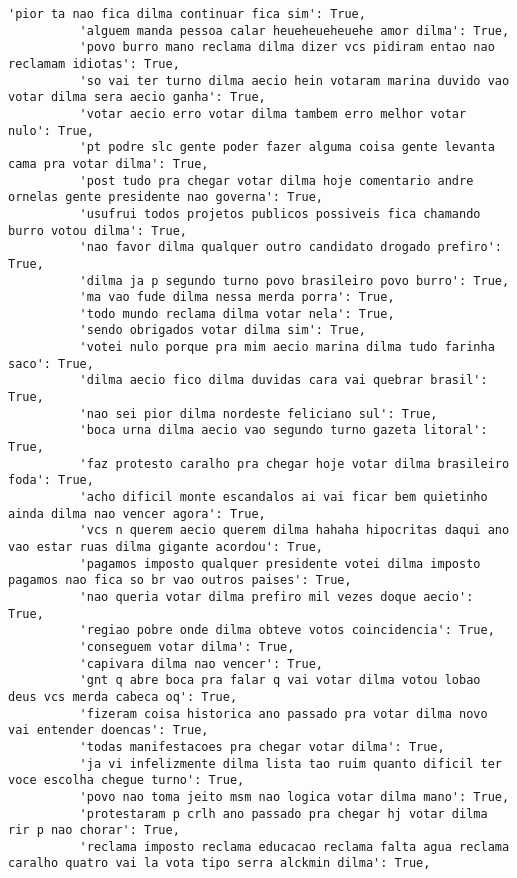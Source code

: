 \documentclass[11pt]{article}
\begin{document}
\begin{Verbatim}[commandchars=\\\{\}]
          'pior ta nao fica dilma continuar fica sim': True,
          'alguem manda pessoa calar heueheueheuehe amor dilma': True,
          'povo burro mano reclama dilma dizer vcs pidiram entao nao reclamam idiotas': True,
          'so vai ter turno dilma aecio hein votaram marina duvido vao votar dilma sera aecio ganha': True,
          'votar aecio erro votar dilma tambem erro melhor votar nulo': True,
          'pt podre slc gente poder fazer alguma coisa gente levanta cama pra votar dilma': True,
          'post tudo pra chegar votar dilma hoje comentario andre ornelas gente presidente nao governa': True,
          'usufrui todos projetos publicos possiveis fica chamando burro votou dilma': True,
          'nao favor dilma qualquer outro candidato drogado prefiro': True,
          'dilma ja p segundo turno povo brasileiro povo burro': True,
          'ma vao fude dilma nessa merda porra': True,
          'todo mundo reclama dilma votar nela': True,
          'sendo obrigados votar dilma sim': True,
          'votei nulo porque pra mim aecio marina dilma tudo farinha saco': True,
          'dilma aecio fico dilma duvidas cara vai quebrar brasil': True,
          'nao sei pior dilma nordeste feliciano sul': True,
          'boca urna dilma aecio vao segundo turno gazeta litoral': True,
          'faz protesto caralho pra chegar hoje votar dilma brasileiro foda': True,
          'acho dificil monte escandalos ai vai ficar bem quietinho ainda dilma nao vencer agora': True,
          'vcs n querem aecio querem dilma hahaha hipocritas daqui ano vao estar ruas dilma gigante acordou': True,
          'pagamos imposto qualquer presidente votei dilma imposto pagamos nao fica so br vao outros paises': True,
          'nao queria votar dilma prefiro mil vezes doque aecio': True,
          'regiao pobre onde dilma obteve votos coincidencia': True,
          'conseguem votar dilma': True,
          'capivara dilma nao vencer': True,
          'gnt q abre boca pra falar q vai votar dilma votou lobao deus vcs merda cabeca oq': True,
          'fizeram coisa historica ano passado pra votar dilma novo vai entender doencas': True,
          'todas manifestacoes pra chegar votar dilma': True,
          'ja vi infelizmente dilma lista tao ruim quanto dificil ter voce escolha chegue turno': True,
          'povo nao toma jeito msm nao logica votar dilma mano': True,
          'protestaram p crlh ano passado pra chegar hj votar dilma rir p nao chorar': True,
          'reclama imposto reclama educacao reclama falta agua reclama caralho quatro vai la vota tipo serra alckmin dilma': True,

\end{Verbatim}
\end{document}
